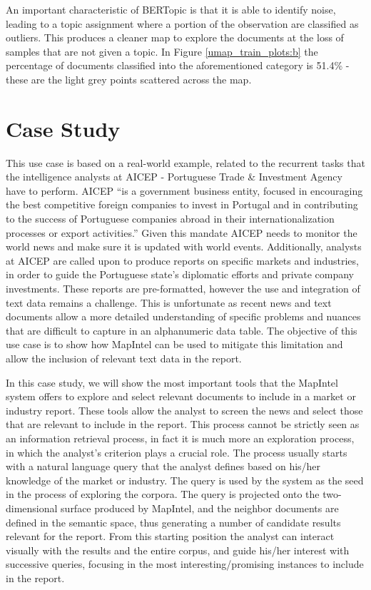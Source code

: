 \documentclass[a4paper]{article}
\begin{document}
An important characteristic of BERTopic is that it is able to identify noise, leading to a topic assignment where a portion of the observation are classified as outliers. This produces a cleaner map to explore the documents at the loss of samples that are not given a topic. In Figure \ref{umap_train_plots:b} the percentage of documents classified into the aforementioned category is 51.4\% - these are the light grey points scattered across the map.

\section{Case Study}
This use case is based on a real-world example, related to the recurrent tasks that the intelligence analysts at AICEP - Portuguese Trade \& Investment Agency have to perform. AICEP “is a government business entity, focused in encouraging the best competitive foreign companies to invest in Portugal and in contributing to the success of Portuguese companies abroad in their internationalization processes or export activities.” Given this mandate AICEP needs to monitor the world news and make sure it is updated with world events. Additionally, analysts at AICEP are called upon to produce reports on specific markets and industries, in order to guide the Portuguese state's diplomatic efforts and private company investments. These reports are pre-formatted, however the use and integration of text data remains a challenge. This is unfortunate as recent news and text documents allow a more detailed understanding of specific problems and nuances that are difficult to capture in an alphanumeric data table. The objective of this use case is to show how MapIntel can be used to mitigate this limitation and allow the inclusion of relevant text data in the report.

In this case study, we will show the most important tools that the MapIntel system offers to explore and select relevant documents to include in a market or industry report. These tools allow the analyst to screen the news and select those that are relevant to include in the report. This process cannot be strictly seen as an information retrieval process, in fact it is much more an exploration process, in which the analyst’s criterion plays a crucial role. The process usually starts with a natural language query that the analyst defines based on his/her knowledge of the market or industry. The query is used by the system as the seed in the process of exploring the corpora. The query is projected onto the two-dimensional surface produced by MapIntel, and the neighbor documents are defined in the semantic space, thus generating a number of candidate results relevant for the report. From this starting position the analyst can interact visually with the results and the entire corpus, and guide his/her interest with successive queries, focusing in the most interesting/promising instances to include in the report.
\end{document}
